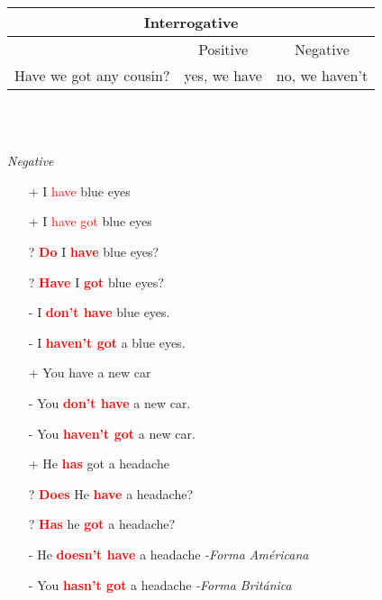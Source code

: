 \documentclass{elegantbook}
\begin{document}
        \vspace{1em}
        \begin{tabular}{|c|c|c|}
            \hline
            \multicolumn{3}{|c|}{Interrogative}\\
            \hline
            &Positive&Negative\\
            \hline
            Have we got any cousin?&yes, we have&no, we haven't\\
            \hline
        \end{tabular}
        \\
        \begin{example}
            \\\emph{Negative}
            \begin{itemize}
                \item [+]I \textcolor{red}{have} blue eyes
                \item [+]I \textcolor{red}{have got} blue eyes
                \item [?] \textcolor{red}{\textbf{Do}} I \textcolor{red}{\textbf{have}} blue eyes?
                \item [?] \textcolor{red}{\textbf{Have}} I \textcolor{red}{\textbf{got}} blue eyes?
                \item [-]I \textcolor{red}{\textbf{don't have}} blue eyes.
                \item [-]I \textcolor{red}{\textbf{haven't got}} a blue eyes.
                \item [+]You have a new car
                \item [-]You \textcolor{red}{\textbf{don't have}} a new car.
                \item [-]You \textcolor{red}{\textbf{haven't got}} a new car.
                \item [+]He \textcolor{red}{\textbf{has}} got a headache
                \item [?]\textcolor{red}{\textbf{Does}} He \textcolor{red}{\textbf{have}} a headache?
                \item [?]\textcolor{red}{\textbf{Has}} he \textcolor{red}{\textbf{got}} a headache?
                \item [-]He \textcolor{red}{\textbf{doesn't have}} a headache \textit{\small{-Forma Américana}}
                \item [-]You \textcolor{red}{\textbf{hasn't got}} a headache \textit{\small{-Forma Británica}}
            \end{itemize}
        \end{example}
\end{document}
